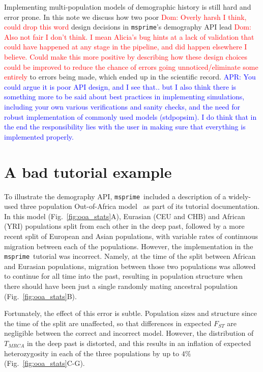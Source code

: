 \documentclass{article}
\newcommand{\msprime}[0]{\texttt{msprime}}
\newcommand{\aprcomment}[1]{{\textcolor{blue}{APR: #1}}}
\newcommand{\dncomment}[1]{{\textcolor{red}{Dom: #1}}}
\begin{document}
Implementing multi-population models of demographic history is still hard and error
prone. In this note we discuss how two poor
\dncomment{Overly harsh I think, could drop this word} design decisions
in \msprime's demography API lead
\dncomment{Also not fair I don't think. I mean Alicia's bug hints at a lack of validation that
could have happened at any stage in the pipeline, and did happen elsewhere
I believe. Could make this more positive by describing how these design choices
could be improved to reduce the chance of errors going unnoticed/eliminate
some entirely} to errors being made, which ended
up in the scientific record.
\aprcomment{You could argue it is poor API design, and I see that.. but I also
think there is something more to be said about best practices in implementing simulations,
including your own various verifications and sanity checks, and the need for robust
implementation of commonly used models (stdpopsim). I do think that in the end
the responsibility lies with the user in making sure that everything is implemented
properly.}

\section{A bad tutorial example}

To illustrate the demography API, \msprime\ included a description of a widely-used
three population Out-of-Africa model~\citep{gutenkunst2009inferring}
as part of its tutorial documentation. In this model (Fig.~\ref{fig:ooa_stats}A),
Eurasian (CEU and CHB) and African (YRI) populations split from each other in the deep past,
followed by a more recent split of European and Asian populations, with variable rates of
continuous migration between each of the populations. However, the implementation in the
\msprime\ tutorial was incorrect. Namely, at the time of the split between African and Eurasian
populations, migration between those two populations was allowed to continue for all time into the
past, resulting in population structure when there should have been just a single
randomly mating ancestral population (Fig.~\ref{fig:ooa_stats}B).

Fortunately, the effect of this error is subtle. Population sizes and structure since the time of
the split are unaffected, so that differences in expected $F_{ST}$ are negligible between
the correct and incorrect model. However, the distribution of $T_{MRCA}$ in the deep past
is distorted, and this results in an inflation of expected heterozygosity in each of the three
populations by up to $4\%$ (Fig.~\ref{fig:ooa_stats}C-G).
\end{document}
